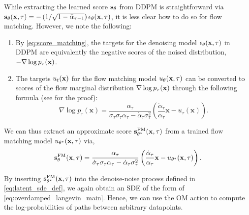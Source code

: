 While extracting the learned score $\mathbf{s}_\theta$ from DDPM is straightforward via $\mathbf{s}_\theta (\mathbf{x}, \tau) = -\left(1 / \sqrt{1-\bar{\alpha}_{\tau-1}}\right)\epsilon_\theta (\mathbf{x}, \tau)$, it is less clear how to do so for flow matching. However, we note the following:
\begin{enumerate}
    \item By \eqref{eq:score_matching}, the targets for the denoising model $\epsilon_\theta(\mathbf{x}, \tau)$ in DDPM are equivalently the negative scores of the noised distribution, $-\nabla \log p_\tau (\mathbf{x})$.
    \item The targets $u_t(\mathbf{x})$ for the flow matching model $u_\theta(\mathbf{x}, \tau)$ can be converted to scores of the flow marginal distribution $\nabla \log p_\tau (\mathbf{x})$ through the following formula (see  for the proof):
    \begin{equation}
        \label{eq:flow_force}
          \nabla \log p_\tau(\mathbf{x}) =  \frac{\alpha_\tau}{\dot{\sigma}_\tau \sigma_\tau \alpha_\tau - \dot{\alpha}_\tau\sigma_\tau^2} \left(\frac{\dot{\alpha}_\tau}{\alpha_\tau}\mathbf{x} - u_\tau(\mathbf{x})\right).
    \end{equation}
\end{enumerate}
\vspace{-7pt}

We can thus extract an approximate score $\mathbf{s}_{\theta^*}^{\mathrm{FM}}(\mathbf{x}, \tau)$ from a trained flow matching model $u_{\theta^*}(\mathbf{x}, \tau)$ via,
\begin{equation}
    \label{eq:flow_force_theta}
     \mathbf{s}_\theta^{\mathrm{FM}}(\mathbf{x}, \tau) =  \frac{\alpha_\tau}{\dot{\sigma}_\tau \sigma_\tau \alpha_\tau - \dot{\alpha}_\tau\sigma_\tau^2} \left( \frac{\dot{\alpha}_\tau}{\alpha_\tau}\mathbf{x} - u_{\theta^*}(\mathbf{x}, \tau) \right).
\end{equation}

By inserting $\mathbf{s}_{\theta^*}^{\mathrm{FM}}(\mathbf{x}, \tau)$ into the denoise-noise process defined in \eqref{eq:latent_sde_def}, we again obtain an SDE of the form of \eqref{eq:overdamped_langevin_main}. Hence, we can use the OM action to compute the log-probabilities of paths between arbitrary datapoints. 
